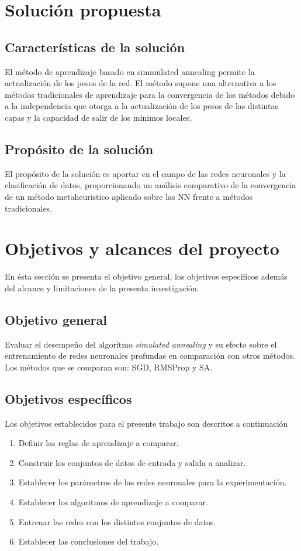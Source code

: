 \section{Solución propuesta}
\subsection{Características de la solución}
El método de aprendizaje basado en simmulated annealing permite la actualización de los pesos de la red. El método supone una alternativa a los métodos tradicionales de aprendizaje para la convergencia de los métodos debido a la independencia que otorga a la actualización de los pesos de las distintas capas y la capacidad de salir de los mínimos locales.

\subsection{Propósito de la solución}
El propósito de la solución es aportar en el campo de las redes neuronales y la clasificación de datos, proporcionando un análisis comparativo de la convergencia de un método metaheuristico aplicado sobre las NN frente a métodos tradicionales.

\section{Objetivos y alcances del proyecto}
En ésta sección se presenta el objetivo general, los objetivos específicos además del alcance y limitaciones de la presenta investigación.

\subsection{Objetivo general}
Evaluar el desempeño del algoritmo {\em simulated annealing} y su efecto sobre el entrenamiento de redes neuronales profundas en comparación con otros métodos. Los métodos que se comparan son: SGD, RMSProp y SA.

\subsection{Objetivos específicos}
Los objetivos establecidos para el presente trabajo son descritos a continuación
\begin{enumerate}
	\item Definir las reglas de aprendizaje a comparar.
	\item Construir los conjuntos de datos de entrada y salida a analizar.
	\item Establecer los parámetros de las redes neuronales para la experimentación.
	\item Establecer los algoritmos de aprendizaje a comparar.
	\item Entrenar las redes con los distintos conjuntos de datos.
	\item Establecer las conclusiones del trabajo.
\end{enumerate}

